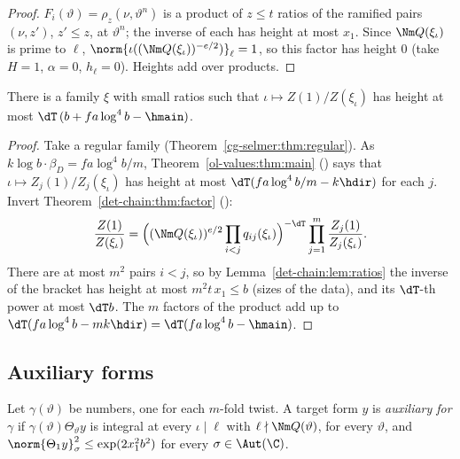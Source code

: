 \begin{proof}
$F_i(\vartheta)=\rho_z(\nu,\vartheta^n)$ is a product of $z\le t$ ratios of the ramified pairs
$(\nu,z')$, $z'\le z$, at $\vartheta^n$; the inverse of each has height at most $x_1$. Since
$\Nm Q(\xi_\iota)$ is prime to $\ell$, $\norm{\iota((\Nm Q(\xi_\iota))^{-e/2})}_\ell=1$, so this
factor has height $0$ (take $H=1$, $\alpha=0$, $h_\ell=0$). Heights add over products.
\end{proof}

\begin{theorem}\label{det-chain:thm:height}
There is a family $\xi$ with small ratios such that $\iota\mapsto Z(1)/Z(\xi_\iota)$ has height at
most $\dT\,(b+f a\log^4b-\hmain)$.
\end{theorem}

\begin{proof}
Take a regular family (Theorem~\ref{cg-selmer:thm:regular}). As $k\log b\cdot\beta_D=f a\log^4b/m$,
Theorem~\ref{ol-values:thm:main} () says that
$\iota\mapsto Z_j(1)/Z_j(\xi_\iota)$ has height at
most $\dT(f a\log^4b/m-k\hdir)$ for each $j$. Invert Theorem~\ref{det-chain:thm:factor}
():
\[
  \frac{Z(1)}{Z(\xi_\iota)}=\Bigl((\Nm Q(\xi_\iota))^{e/2}\prod_{i<j}q_{ij}(\xi_\iota)\Bigr)^{-\dT}
  \prod_{j=1}^{m}\frac{Z_j(1)}{Z_j(\xi_\iota)} .
\]
There are at most $m^2$ pairs $i<j$, so by Lemma~\ref{det-chain:lem:ratios} the inverse of the
bracket has height at most $m^2t\,x_1\le b$ (sizes of the data), and its $\dT$-th power at most $\dT b$. The $m$ factors
of the product add up to $\dT(f a\log^4b-mk\hdir)=\dT(f a\log^4b-\hmain)$.
\end{proof}

\subsection{Auxiliary forms}\label{det-chain:sec:aux}

\begin{definition}\label{det-chain:def:aux}
Let $\gamma(\vartheta)$ be numbers, one for each $m$-fold twist. A target form $y$ is
\emph{auxiliary for $\gamma$} if $\gamma(\vartheta)\Theta_\vartheta y$ is integral at every
$\iota\mid\ell$ with $\ell\nmid\Nm Q(\vartheta)$, for every $\vartheta$, and
$\norm{\Theta_1y}_\sigma^2\le\exp(2x_1^2b^2)$ for every $\sigma\in\Aut(\C)$.
\end{definition}

